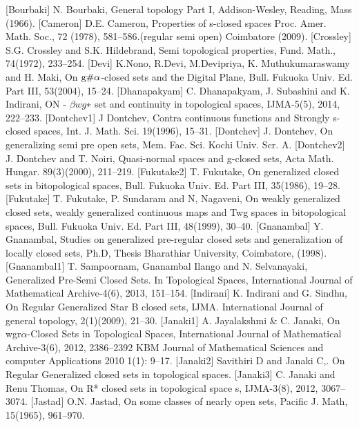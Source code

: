 \begin{thebibliography}{99}
 [Bourbaki] N. Bourbaki, General topology Part I, Addison-Wesley, Reading, Mass (1966).
 [Cameron] D.E. Cameron, Properties of s-closed spaces Proc. Amer. Math. Soc., 72 (1978), 581--586.(regular semi open) Coimbatore (2009).
 [Crossley] S.G. Crossley and S.K. Hildebrand, Semi topological properties, Fund. Math., 74(1972), 233--254.
 [Devi] K.Nono, R.Devi, M.Devipriya, K. Muthukumaraswamy and H. Maki, On $\mathrm{g}\#\alpha$-closed sets and the Digital Plane, Bull. Fukuoka Univ. Ed. Part III, 53(2004), 15--24.
 [Dhanapakyam] C. Dhanapakyam, J. Subashini and K. Indirani, ON - $\beta wg$∗ set and continuity in topological spaces, IJMA-5(5), 2014, 222--233.
 [Dontchev1] J Dontchev, Contra continuous functions and Strongly s-closed spaces, Int. J. Math. Sci. 19(1996), 15--31.
 [Dontchev] J. Dontchev, On generalizing semi pre open sets, Mem. Fac. Sci. Kochi Univ. Scr. A. 
 [Dontchev2] J. Dontchev and T. Noiri, Quasi-normal spaces and g-closed sets, Acta Math. Hungar. 89(3)(2000), 211--219.
 [Fukutake2] T. Fukutake, On generalized closed sets in bitopological spaces, Bull. Fukuoka Univ. Ed. Part III, 35(1986), 19--28.
 [Fukutake] T. Fukutake, P. Sundaram and N, Nagaveni, On weakly generalized closed sets, weakly generalized continuous maps and Twg spaces in bitopological spaces, Bull. Fukuoka Univ. Ed. Part III, 48(1999), 30--40.
  [Gnanambal] Y. Gnanambal, Studies on generalized pre-regular closed sets and generalization of locally closed sets, Ph.D, Thesis Bharathiar University, Coimbatore, (1998).
 [Gnanambal1] T. Sampoornam, Gnanambal Ilango and N. Selvanayaki, Generalized Pre-Semi Closed Sets. In Topological Spaces, International Journal of Mathematical Archive-4(6), 2013, 151--154.
 [Indirani] K. Indirani and G. Sindhu, On Regular Generalized Star B closed sets, IJMA. International Journal of general topology, 2(1)(2009), 21--30.
  [Janaki1] A. Jayalakshmi  \& C. Janaki, On wgr$\alpha$-Closed Sets in Topological Spaces, International Journal of Mathematical Archive-3(6), 2012, 2386--2392 KBM  Journal of Mathematical Sciences and computer Applications 2010 1(1): 9--17.
 [Janaki2] Savithiri D and Janaki C,. On Regular Generalized closed sets in topological spaces.
 [Janaki3] C. Janaki and Renu Thomas, On R* closed sets in topological space s, IJMA-3(8), 2012, 3067--3074.
 [Jastad] O.N. Jastad, On some classes of nearly open sets, Pacific J. Math, 15(1965), 961--970.

\end{thebibliography}
